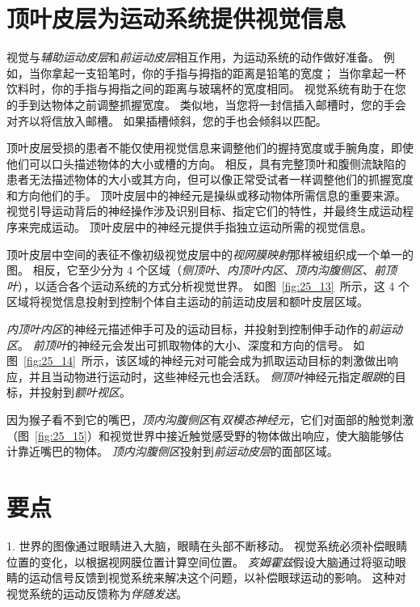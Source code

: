 \section{顶叶皮层为运动系统提供视觉信息}

视觉与\textit{辅助运动皮层}和\textit{前运动皮层}相互作用，为运动系统的动作做好准备。
例如，当你拿起一支铅笔时，你的手指与拇指的距离是铅笔的宽度；
当你拿起一杯饮料时，你的手指与拇指之间的距离与玻璃杯的宽度相同。
视觉系统有助于在您的手到达物体之前调整抓握宽度。
类似地，当您将一封信插入邮槽时，您的手会对齐以将信放入邮槽。
如果插槽倾斜，您的手也会倾斜以匹配。


顶叶皮层受损的患者不能仅使用视觉信息来调整他们的握持宽度或手腕角度，即使他们可以口头描述物体的大小或槽的方向。
相反，具有完整顶叶和腹侧流缺陷的患者无法描述物体的大小或其方向，但可以像正常受试者一样调整他们的抓握宽度和方向他们的手。
顶叶皮层中的神经元是操纵或移动物体所需信息的重要来源。
视觉引导运动背后的神经操作涉及识别目标、指定它们的特性，并最终生成运动程序来完成运动。
顶叶皮层中的神经元提供手指独立运动所需的视觉信息。


顶叶皮层中空间的表征不像初级视觉皮层中的\textit{视网膜映射}那样被组织成一个单一的图。
相反，它至少分为 4 个区域（\textit{侧顶叶}、\textit{内顶叶内区}、\textit{顶内沟腹侧区}、\textit{前顶叶}），以适合各个运动系统的方式分析视觉世界。
如图~\ref{fig:25_13}~所示，这 4 个区域将视觉信息投射到控制个体自主运动的前运动皮层和额叶皮层区域。


\textit{内顶叶内区}的神经元描述伸手可及的运动目标，并投射到控制伸手动作的\textit{前运动区}。
\textit{前顶叶}的神经元会发出可抓取物体的大小、深度和方向的信号。
如图~\ref{fig:25_14}~所示，该区域的神经元对可能会成为抓取运动目标的刺激做出响应，并且当动物进行运动时，这些神经元也会活跃。
\textit{侧顶叶}神经元指定\textit{眼跳}的目标，并投射到\textit{额叶视区}。


因为猴子看不到它的嘴巴，\textit{顶内沟腹侧区}有\textit{双模态神经元}，它们对面部的触觉刺激（图~\ref{fig:25_15}）和视觉世界中接近触觉感受野的物体做出响应，使大脑能够估计靠近嘴巴的物体。
\textit{顶内沟腹侧区}投射到\textit{前运动皮层}的面部区域。



\section{要点}

1. 世界的图像通过眼睛进入大脑，眼睛在头部不断移动。
视觉系统必须补偿眼睛位置的变化，以根据视网膜位置计算空间位置。
\textit{亥姆霍兹}假设大脑通过将驱动眼睛的运动信号反馈到视觉系统来解决这个问题，以补偿眼球运动的影响。
这种对视觉系统的运动反馈称为\textit{伴随发送}。


